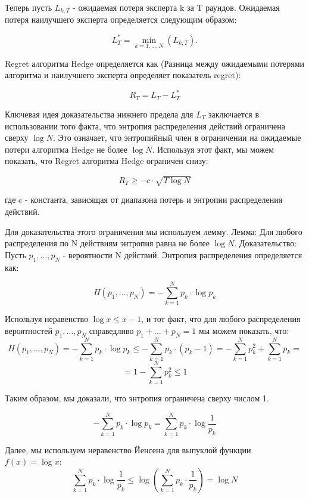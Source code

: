 \documentclass[a4paper,14pt]{extarticle}
\begin{document}
Теперь пусть $L_{k,T}$ - ожидаемая потеря эксперта k за T раундов. Ожидаемая потеря наилучшего эксперта определяется следующим образом:

\begin{equation}L^*_T = \min\limits_{k=1,\dots,N}(L_{k,T}).\end{equation}

Regret алгоритма Hedge определяется как (Разница между ожидаемыми потерями алгоритма и наилучшего эксперта определяет показатель regret):

\begin{equation}R_T = L_T - L^*_T\end{equation}

Ключевая идея доказательства нижнего предела для $L_T$ заключается в использовании того факта, что энтропия распределения действий ограничена сверху $\log N$. Это означает, что энтропийный член в ограничении на ожидаемые потери алгоритма Hedge не более $\log N$. Используя этот факт, мы можем показать, что Regret алгоритма Hedge ограничен снизу:

\begin{equation}R_T \geq -c \cdot \sqrt{T \log N}\end{equation}

где c - константа, зависящая от диапазона потерь и энтропии распределения действий.

Для доказательства этого ограничения мы используем лемму.\endgraf
Лемма: Для любого распределения по N действиям энтропия равна не более $\log N$.
Доказательство: Пусть $p_1, \dots, p_N$ - вероятности N действий. Энтропия распределения определяется как:

\begin{equation}H(p_1, \dots, p_N) = -\sum_{k=1}^{N}{p_k \cdot \log p_k}\end{equation}

Используя неравенство $\log x \leq x - 1$, и тот факт, что для любого распределения вероятностей $p_1, \dots, p_N$ справедливо $p_1 + \dots + p_N = 1$ мы можем показать, что:
$$H(p_1, \dots, p_N) = -\sum_{k=1}^{N}{p_k \cdot \log p_k} \leq -\sum_{k=1}^{N}{p_k \cdot (p_k - 1)} = -\sum_{k=1}^{N}{p_k^2 } + \sum_{k=1}^{N}{p_k} =$$
$$
= 1 - \sum_{k=1}^{N}{p_k^2} \leq 1
$$

Таким образом, мы доказали, что энтропия ограничена сверху числом 1.

$$-\sum_{k=1}^{N}{p_k \cdot \log p_k} = \sum_{k=1}^{N}{p_k \cdot \log \frac{1}{p_k}}$$

Далее, мы используем неравенство Йенсена для выпуклой функции $f(x) = \log x$:
$$\sum_{k=1}^{N}{p_k \cdot \log \frac{1}{p_k}} \leq \log\left({\sum_{k=1}^{N}{p_k \cdot \frac{1}{p_k}}}\right) = \log{N}$$
\end{document}
